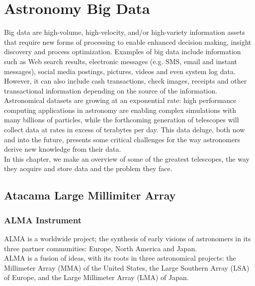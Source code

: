 \chapter{Astronomy Big Data}


Big data are high-volume, high-velocity, and/or high-variety information assets that require new forms of processing to enable enhanced decision making, insight discovery and process optimization. Examples of big data include information such as Web search results, electronic messages (e.g. SMS, email and instant messages), social media postings, pictures, videos and even system log data. However, it can also include cash transactions, check images, receipts and other transactional information depending on the source of the information. \\

Astronomical datasets are growing at an exponential rate: high performance computing applications in astronomy are enabling complex simulations with many billions of particles, while the forthcoming generation of telescopes will collect data at rates in excess of terabytes per day. This data deluge, both now and into the future, presents some critical challenges for the way astronomers derive new knowledge from their data.\\

In this chapter, we make an overview of some of the greatest telescopes, the way they acquire and store data and the problem they face.


\section{Atacama Large Millimiter Array}

\subsection{ALMA Instrument}

ALMA is a worldwide project; the synthesis of early visions of astronomers in its three partner communities: Europe, North America and Japan.\\

ALMA is a fusion of ideas, with its roots in three astronomical projects: the Millimeter Array (MMA) of the United States, the Large Southern Array (LSA) of Europe, and the Large Millimeter Array (LMA) of Japan.\\

